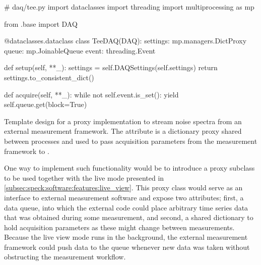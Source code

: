 \begin{marginlisting}
    \begin{pycode}[
        fontsize=\footnotesize,%
        breaklines,%
        breakafter=.,%
    ]
        # daq/tee.py
        import dataclasses
        import threading
        import multiprocessing as mp

        from .base import DAQ

        @dataclasses.dataclass
        class TeeDAQ(DAQ):
            settings: mp.managers.DictProxy
            queue: mp.JoinableQueue
            event: threading.Event

            def setup(self, **_):
                settings = self.DAQSettings(self.settings)
                return settings.to_consistent_dict()

            def acquire(self, **_):
                while not self.event.is_set():
                    yield self.queue.get(block=True)
    \end{pycode}
    \caption[ template]{
        Template design for a proxy  implementation to stream noise spectra from an external measurement framework.
        The  attribute is a dictionary proxy shared between processes and used to pass acquisition parameters from the measurement framework to \pyspeck.
    }
    \label{lst:speck:conclusion:tee}
\end{marginlisting}

One way to implement such functionality would be to introduce a proxy  subclass to be used together with the live mode presented in \cref{subsec:speck:software:features:live_view}.
This proxy class would serve as an interface to external measurement software and expose two attributes; first, a data queue, into which the external code could place arbitrary time series data that was obtained during some measurement, and second, a shared dictionary to hold acquisition parameters as these might change between measurements.
Because the live view mode runs in the background, the external measurement framework could push data to the queue whenever new data was taken without obstructing the measurement workflow.

